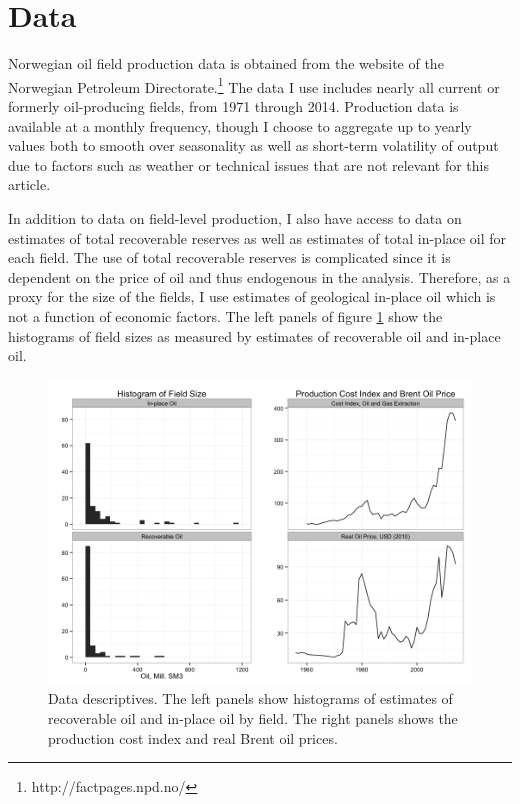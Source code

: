 \documentclass[12pt]{article}
\begin{document}
\section{Data}
Norwegian oil field production data is obtained from the website of the Norwegian Petroleum Directorate.\footnote{http://factpages.npd.no/} The data I use includes nearly all current or formerly oil-producing fields, from 1971 through 2014. Production data is available at a monthly frequency, though I choose to aggregate up to yearly values both to smooth over seasonality as well as short-term volatility of output due to factors such as weather or technical issues that are not relevant for this article. 

In addition to data on field-level production, I also have access to data on estimates of total recoverable reserves as well as estimates of total in-place oil for each field. The use of total recoverable reserves is complicated since it is dependent on the price of oil and thus endogenous in the analysis. Therefore, as a proxy for the size of the fields, I use estimates of geological in-place oil which is not a function of economic factors. The left panels of figure \ref{data_descriptives} show the histograms of field sizes as measured by estimates of recoverable oil and in-place oil. 

\begin{figure}
	\includegraphics[width=1\textwidth]{figures/data_descriptives.png}
	\caption{Data descriptives. The left panels show histograms of estimates of recoverable oil and in-place oil by field. The right panels shows the production cost index and real Brent oil prices.}
	\label{data_descriptives}
\end{figure}
\end{document}
